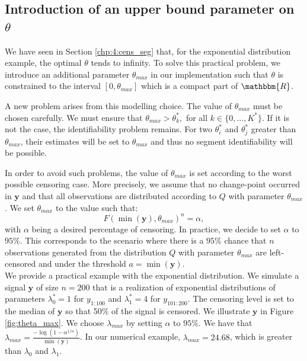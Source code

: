 \subsection{Introduction of an upper bound parameter on $\theta$}

We have seen in Section \ref{chp:4:cens_seg} that, for the exponential distribution example, the optimal $\theta$ tends to infinity. To solve this practical problem, we introduce an additional parameter $\theta_{max}$ in our implementation such that $\theta$ is constrained to the interval $[0,\theta_{max}]$ which is a compact part of $\mathbbm{R}$. 

A new problem arises from this modelling choice. The value of $\theta_{max}$ must be chosen carefully. We must ensure that $\theta_{max}> \theta^*_k,$ for all $k \in \{0,\dots,K^*\}$. If it is not the case, the identifiability problem remains. For two $\theta^*_i$ and $\theta^*_j$  greater than $\theta_{max}$, their estimates will be set to $\theta_{max}$ and thus no segment identifiability will be possible. 

In order to avoid such problems, the value of $\theta_{max}$ is set according to the worst possible censoring case. More precisely, we assume that no change-point occurred in $\bm y$ and that all observations are distributed according to $Q$ with parameter $\theta_{max}$. We set $\theta_{max}$ to the value such that: 
\begin{equation}\label{chp:4:thetamax}
F(\min(\bm y),\theta_{max})^n = \alpha,
\end{equation}
with $\alpha$ being a desired percentage of censoring. In practice, we decide to set $\alpha$ to $95\%$. This corresponds to the scenario where there is a $95\%$ chance that $n$ observations generated from the distribution $Q$ with parameter $\theta_{max}$ are left-censored and under the threshold $a = \min(\bm y)$. \\

We provide a practical example with the exponential distribution. We simulate a signal $\bm y$ of size $n = 200$ that is a realization of exponential distributions of parameters $\lambda^*_0 = 1$ for $y_{1:100}$ and $\lambda^*_1 = 4$ for $y_{101:200}$. The censoring level is set to the median of $\bm y$ so that 50$\%$ of the signal is censored. We illustrate $\bm y$ in Figure \ref{fig:theta_max}. We choose $\lambda_{max}$ by setting $\alpha$ to $95\%$. We have that $\lambda_{max} = \frac{-\log(1-\alpha^{1/n})}{\min(\bm y)}$. In our numerical example, $\lambda_{max} = 24.68$, which is greater than $\lambda_0$ and $\lambda_1$. \\

